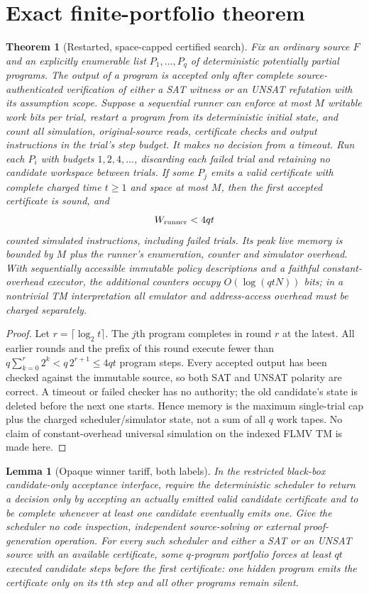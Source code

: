 \documentclass[11pt]{article}
\newtheorem{theorem}{Theorem}
\newtheorem{lemma}{Lemma}
\begin{document}
\section{Exact finite-port\-folio theorem}
\begin{theorem}[Restarted, space-capped certified search]
Fix an ordinary source $F$ and an explicitly enumerable list $P_1,\dots,P_q$ of deterministic potentially partial programs. The output of a program is accepted only after complete source-authenticated verification of either a SAT witness or an UNSAT refutation with its assumption scope. Suppose a sequential runner can enforce at most $M$ writable work bits per trial, restart a program from its deterministic initial state, and count all simulation, original-source reads, certificate checks and output instructions in the trial's step budget. It makes no decision from a timeout. Run each $P_i$ with budgets $1,2,4,\ldots$, discarding each failed trial and retaining no candidate workspace between trials. If some $P_j$ emits a valid certificate with complete charged time $t\ge1$ and space at most $M$, then the first accepted certificate is sound, and
\[
  W_{\rm runner}<4qt
\]
counted simulated instructions, including failed trials. Its peak live memory is bounded by $M$ plus the runner's enumeration, counter and simulator overhead. With sequentially accessible immutable policy descriptions and a faithful constant-overhead executor, the additional counters occupy $O(\log(qtN))$ bits; in a nontrivial TM interpretation all emulator and address-access overhead must be charged separately.
\end{theorem}
\begin{proof}
Let $r=\lceil\log_2t\rceil$. The $j$th program completes in round $r$ at the latest. All earlier rounds and the prefix of this round execute fewer than $q\sum_{k=0}^{r}2^k<q\,2^{r+1}\le4qt$ program steps. Every accepted output has been checked against the immutable source, so both SAT and UNSAT polarity are correct. A timeout or failed checker has no authority; the old candidate's state is deleted before the next one starts. Hence memory is the maximum single-trial cap plus the charged scheduler/simulator state, not a sum of all $q$ work tapes. No claim of constant-overhead universal simulation on the indexed FLMV TM is made here.
\end{proof}
\begin{lemma}[Opaque winner tariff, both labels]
In the restricted black-box \emph{candidate-only acceptance} interface, require the deterministic scheduler to return a decision only by accepting an actually emitted valid candidate certificate and to be complete whenever at least one candidate eventually emits one. Give the scheduler no code inspection, independent source-solving or external proof-generation operation. For every such scheduler and either a SAT or an UNSAT source with an available certificate, some $q$-program portfolio forces at least $qt$ executed candidate steps before the first certificate: one hidden program emits the certificate only on its $t$th step and all other programs remain silent.
\end{lemma}
\end{document}
